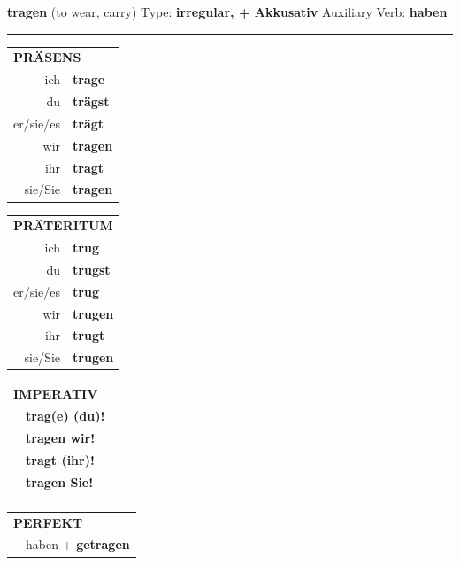 \documentclass[10pt,a4paper]{revtex4-2}
\begin{document}
\begin{verbbox-acc}
    {\Large \bf tragen} (to wear, carry) \hfill Type: \textbf{irregular, + Akkusativ} \hfill Auxiliary Verb: \textbf{haben} 
    
     \vspace{5pt}

    \hrule
    
    \vspace{5pt}

  \begin{tabular}{rl}
     \multicolumn{2}{l}{\textbf{PRÄSENS} }\\
    ich & \textbf{trage}\\
    du & \textbf{trägst}\\
    er/sie/es & \textbf{trägt}\\
    wir & \textbf{tragen}\\
    ihr & \textbf{tragt}\\
    sie/Sie & \textbf{tragen}\\
  \end{tabular}
  \hfill
     \begin{tabular}{rl}
    \multicolumn{2}{l}{\textbf{PRÄTERITUM} }\\
    ich & \textbf{trug}\\
    du & \textbf{trugst}\\
    er/sie/es & \textbf{trug}\\
    wir & \textbf{trugen}\\
    ihr & \textbf{trugt}\\
    sie/Sie & \textbf{trugen}\\
  \end{tabular}
  \hfill
  \begin{tabular}{rl}
     \multicolumn{2}{l}{\textbf{IMPERATIV} }\\
   & \textbf{trag(e) (du)!}\\
   & \textbf{tragen wir!}\\
   & \textbf{tragt (ihr)!}\\
   & \textbf{tragen Sie!}\\
   & \vspace{10pt}
  \end{tabular}

    \vspace{10pt}

 \begin{tabular}{rl}
     \multicolumn{2}{l}{\textbf{PERFEKT}}\\
   & haben + \textbf{getragen}\\
  \end{tabular}
\hfill
   \begin{tabular}{rl}
   

\end{tabular}
\end{verbbox-acc}
\end{document}
